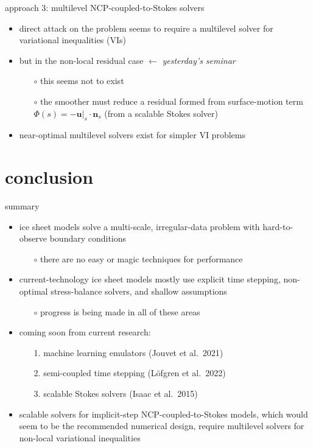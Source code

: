 \documentclass[svgnames,
               hyperref={colorlinks,citecolor=DeepPink4,linkcolor=FireBrick,urlcolor=Maroon},
               usepdftitle=false]  %
               {beamer}
\newcommand{\bn}{\mathbf{n}}
\newcommand{\bu}{\mathbf{u}}
\begin{document}
\begin{frame}{approach 3: multilevel NCP-coupled-to-Stokes solvers}

\begin{itemize}
\item direct attack on the problem seems to require a \alert{multilevel} solver for \alert{variational inequalities} (VIs)
\item but in the \alert{non-local residual case} \hfill $\gets$ \emph{yesterday's seminar}
    \begin{itemize}
    \item[$\circ$] this seems not to exist
    \item[$\circ$] the \alert{smoother} must reduce a residual formed from surface-motion term $\Phi(s) = - \bu|_s\cdot \bn_s$ (from a scalable Stokes solver)
    \end{itemize}
\item near-optimal multilevel solvers exist for simpler VI problems
\end{itemize}
\end{frame}


\section{conclusion}

\begin{frame}{\alert{summary}}

\begin{itemize}
\item ice sheet models solve a multi-scale, irregular-data problem with hard-to-observe boundary conditions
   \begin{itemize}
   \item[$\circ$] there are \alert{no easy or magic techniques} for performance
   \end{itemize}
\item<2-> current-technology ice sheet models mostly use \alert{explicit} time stepping, \alert{non-optimal} stress-balance solvers, and \alert{shallow} assumptions
   \begin{itemize}
   \item[$\circ$] progress is being made in all of these areas
   \end{itemize}
\item<3-> \alert{coming soon} from current research:
   \begin{enumerate}
   \item[1.] machine learning emulators (Jouvet et al.~2021)
   \item[2.] semi-coupled time stepping (L{\"o}fgren et al.~2022)
   \item[3.] scalable Stokes solvers (Isaac et al.~2015)   
   \end{enumerate}
\item<4-> scalable solvers for implicit-step NCP-coupled-to-Stokes models, which would seem to be the recommended numerical design, require \alert{multilevel solvers for non-local variational inequalities}
\end{itemize}
\end{frame}
\end{document}
